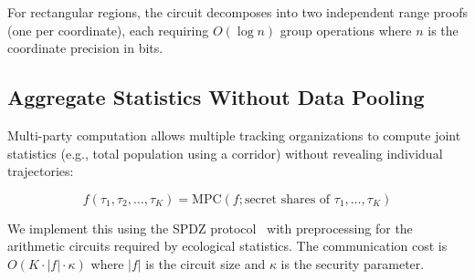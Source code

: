 For rectangular regions, the circuit decomposes into two independent range proofs (one per coordinate), each requiring $O(\log n)$ group operations where $n$ is the coordinate precision in bits.

\subsection{Aggregate Statistics Without Data Pooling}

Multi-party computation allows multiple tracking organizations to compute joint statistics (e.g., total population using a corridor) without revealing individual trajectories:

\begin{equation}
f(\tau_1, \tau_2, \ldots, \tau_K) = \text{MPC}(f; \text{secret shares of } \tau_1, \ldots, \tau_K)
\end{equation}

We implement this using the SPDZ protocol~\cite{damgard2012} with preprocessing for the arithmetic circuits required by ecological statistics. The communication cost is $O(K \cdot |f| \cdot \kappa)$ where $|f|$ is the circuit size and $\kappa$ is the security parameter.

